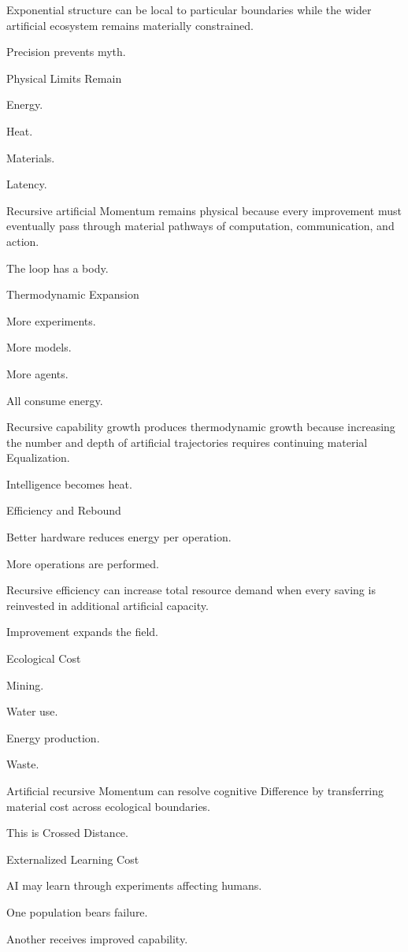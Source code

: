Exponential structure can be local to particular boundaries while the wider artificial ecosystem remains materially constrained.

Precision prevents myth.

Physical Limits Remain

Energy.

Heat.

Materials.

Latency.

Recursive artificial Momentum remains physical because every improvement must eventually pass through material pathways of computation, communication, and action.

The loop has a body.

Thermodynamic Expansion

More experiments.

More models.

More agents.

All consume energy.

Recursive capability growth produces thermodynamic growth because increasing the number and depth of artificial trajectories requires continuing material Equalization.

Intelligence becomes heat.

Efficiency and Rebound

Better hardware reduces energy per operation.

More operations are performed.

Recursive efficiency can increase total resource demand when every saving is reinvested in additional artificial capacity.

Improvement expands the field.

Ecological Cost

Mining.

Water use.

Energy production.

Waste.

Artificial recursive Momentum can resolve cognitive Difference by transferring material cost across ecological boundaries.

This is Crossed Distance.

Externalized Learning Cost

AI may learn through experiments affecting humans.

One population bears failure.

Another receives improved capability.

